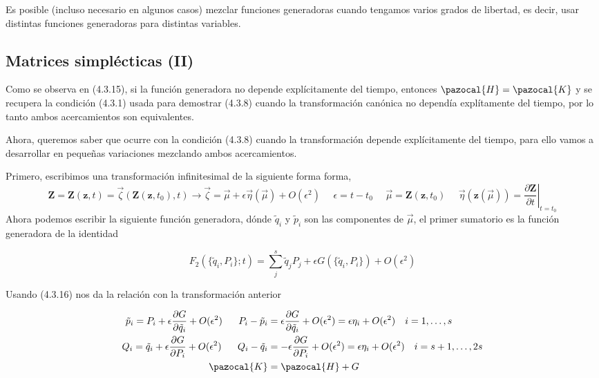 Es posible (incluso necesario en algunos casos) mezclar funciones generadoras cuando tengamos varios grados de libertad, es decir, usar distintas funciones generadoras para distintas variables.
\subsection{Matrices simplécticas (II)}
Como se observa en (4.3.15), si la función generadora no depende explícitamente del tiempo, entonces $\pazocal{H} = \pazocal{K}$ y se recupera la condición (4.3.1) usada para demostrar (4.3.8) cuando la transformación canónica no dependía explítamente del tiempo, por lo tanto ambos acercamientos son equivalentes.

Ahora, queremos saber que ocurre con la condición (4.3.8) cuando la transformación depende explícitamente del tiempo, para ello vamos a desarrollar en pequeñas variaciones mezclando ambos acercamientos.

Primero, escribimos una transformación infinitesimal de la siguiente forma forma, 
\begin{equation} \label{4.2.7}
    \mathbf{Z} = \mathbf{Z}(\mathbf{z},t) = \vec{\zeta}(\mathbf{Z}(\mathbf{z},t_0),t) \rightarrow \vec{\zeta} = \vec{\mu} + \epsilon \vec{\eta}(\vec{\mu}) +O(\epsilon^2) \ \ \ \ \ \ \epsilon = t-t_0 \ \ \ \ \ \ \vec{\mu} = \mathbf{Z}(\mathbf{z},t_0) \ \ \ \ \ \  \vec{\eta}(\mathbf{z}(\vec{\mu})) = \left.\frac{\partial \mathbf{Z}}{\partial t}\right|_{t=t_0}
\end{equation} 
Ahora podemos escribir la siguiente función generadora, dónde $\tilde{q}_i$ y $\tilde{p}_i$ son las componentes de $\vec{\mu}$, el primer sumatorio es la función generadora de la identidad

\vspace{-15pt}
\begin{equation} \label{4.2.7}
    F_2(\{\tilde{q}_i,P_i\};t) = \sum_j^s \tilde{q}_j P_j + \epsilon G(\{\tilde{q}_i,P_i\}) + O(\epsilon^2)
\end{equation} 

\vspace{-20pt}
Usando (4.3.16) nos da la relación con la transformación anterior

\vspace{-18pt}
\begin{equation} \label{4.2.7}
    \begin{split}
        \tilde{p}_i = P_i + \epsilon \frac{\partial G}{\partial \tilde{q}_i} + O(\epsilon^2) \ \ \ \ \ P_i-\tilde{p}_i &= \epsilon \frac{\partial G}{\partial \tilde{q}_i} + O(\epsilon^2)= \epsilon \eta_i +O(\epsilon^2)\ \ \ i = 1,\dots,s\\ 
        Q_i = \tilde{q}_i + \epsilon \frac{\partial G}{\partial P_i} + O(\epsilon^2)\ \ \ \ \ Q_i-\tilde{q}_i &= -\epsilon \frac{\partial G}{\partial P_i} + O(\epsilon^2)= \epsilon \eta_i +O(\epsilon^2)\ \ \ i = s+1,\dots,2s \\
        \pazocal{K} &= \pazocal{H} + G
    \end{split}
\end{equation} 

